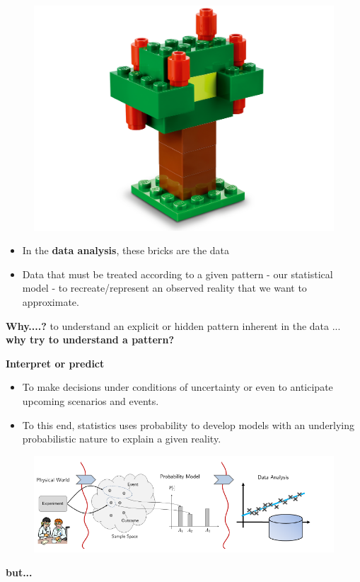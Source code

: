 \documentclass[12pt]{beamer}
\begin{document}
\begin{frame}
	\begin{figure}
		\centering
		\includegraphics[width=.8\linewidth]{lego1}
	\end{figure}
\end{frame}


\begin{frame}
\begin{itemize}
	
	\item In the \textbf{data analysis}, these bricks are the data
	\item Data that must be treated according to a given pattern - our statistical model - to recreate/represent an observed reality that we want to approximate.
\end{itemize}

\textbf{Why....?}
 to understand an explicit or hidden pattern inherent in the data  ... \textbf{why try to understand a pattern?}
	
\end{frame}

\begin{frame}
\small
\textbf{Interpret or predict}
\begin{itemize}
 \item To make decisions under conditions of uncertainty or even to anticipate upcoming scenarios and events.
 
 \item To this end, statistics uses probability to develop models with an underlying probabilistic nature to explain a given reality.
 
\end{itemize}

\begin{figure}
	\centering
\includegraphics[width=.9\linewidth]{data_analisys}
\end{figure}

\textbf{but...}
\end{frame}
\end{document}
